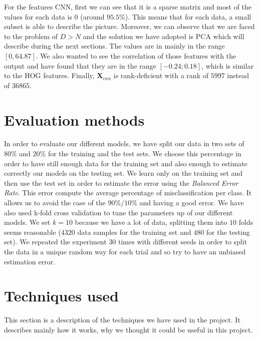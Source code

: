 \documentclass{article} %
\begin{document}
For the features CNN, first we can see that it is a sparse matrix and most of the values for each data is $0$ (around $95.5\%$). This means that for each data, a small subset is able to describe the picture. Moreover, we can observe that we are faced to the problem of $D > N$ and the solution we have adopted is PCA which will describe during the next sections. The values are in mainly in the range $[0, 64.87]$. We also wanted to see the correlation of those features with the output and have found that they are in the range $[-0.24;0.18]$, which is similar to the HOG features. Finally,  $\mathbf{X}_{cnn}$ is rank-deficient with a rank of $5997$ instead of $36865$.

\section{Evaluation methods}

In order to evaluate our different models, we have split our data in two sets of $80\%$ and $20\%$ for the training and the test sets. We choose this percentage in order to have still enough data for the training set and also enough to estimate correctly our models on the testing set. We learn only on the training set and then use the test set in order to estimate the error using the \textit{Balanced Error Rate}. This error compute the average percentage of misclassification per class. It allows us to avoid the case of the $90\%/10\%$ and having a good error. We have also used k-fold cross validation to tune the parameters up of our different models. We set $k=10$ because we have a lot of data, splitting them into $10$ folds seems reasonable ($4320$ data samples for the training set and $480$ for the testing set). We repeated the experiment $30$ times with different seeds in order to split the data in a unique random way for each trial and so try to have an unbiased estimation error. 

\section{Techniques used}

This section is a description of the techniques we have used in the project. It describes mainly how it works, why we thought it could be useful in this project.
\end{document}
